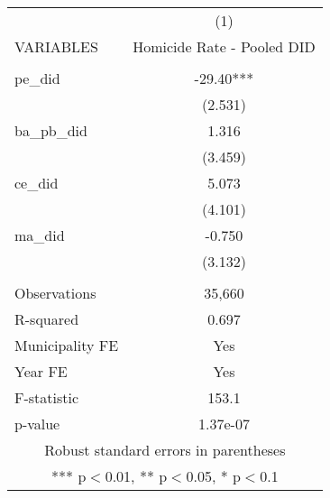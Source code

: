 \documentclass[]{article}
\begin{document}
\begin{tabular}{lc} \hline
 & (1) \\
VARIABLES & Homicide Rate - Pooled DID \\ \hline
 &  \\
pe\_did & -29.40*** \\
 & (2.531) \\
ba\_pb\_did & 1.316 \\
 & (3.459) \\
ce\_did & 5.073 \\
 & (4.101) \\
ma\_did & -0.750 \\
 & (3.132) \\
 &  \\
Observations & 35,660 \\
R-squared & 0.697 \\
Municipality FE & Yes \\
Year FE & Yes \\
F-statistic & 153.1 \\
 p-value & 1.37e-07 \\ \hline
\multicolumn{2}{c}{ Robust standard errors in parentheses} \\
\multicolumn{2}{c}{ *** p$<$0.01, ** p$<$0.05, * p$<$0.1} \\
\end{tabular}
\end{document}
